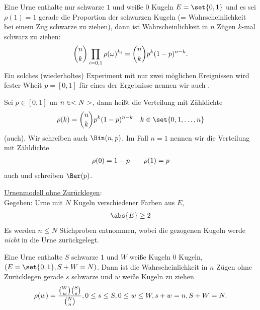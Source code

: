 \begin{example}
	Eine Urne enthalte nur schwarze $1$ und weiße $0$ Kugeln $E=\set{0,1}$ und es sei $\rho(1) = 1$ gerade die Proportion der schwarzen Kugeln (= Wahrscheinlichkeit bei einem Zug schwarze zu ziehen), dann ist Wahrscheinlichkeit in $n$ Zügen $k$-mal schwarz zu ziehen:
	\begin{align}
		\binom{n}{k}\prod_{i=0,1} \rho(\omega)^{k_i} = \binom{n}{k}p^k(1-p)^{n-k}.\notag
	\end{align}
	Ein solches (wiederholtes) Experiment mit nur zwei möglichen Ereignissen wird fester Wheit $p = [0,1]$ für eines der Ergebnisse nennen wir auch .
\end{example}

\begin{definition}
	Sei $p \in [0,1]$ un $n \in <N>$, dann heißt die Verteilung mit Zähldichte
	\begin{align}
		\rho(k) = \binom{n}{k}p^k (1-p)^{n-k}\quad k \in \set{0,1,\dots,n}\notag
	\end{align}
	 (auch). Wir schreiben auch $\Bin(n,p)$. Im Fall $n = 1$ nennen wir die Verteilung mit Zähldichte
	\begin{align}
		\rho(0) = 1-p \qquad \rho(1) = p\notag
	\end{align}
	auch  und schreiben $\Ber(p)$.
\end{definition}
\underline{Urnenmodell ohne Zurücklegen}: \\
Gegeben: Urne mit $N$ Kugeln verschiedener Farben aus $E$,
\begin{align}
	\abs{E} \ge 2
\end{align}
Es werden $n \le N$ Stichproben entnommen, wobei die gezogenen Kugeln werde \emph{nicht} in die Urne zurückgelegt.
\begin{example}
	Eine Urne enthalte $S$ schwarze $1$ und $W$ weiße Kugeln $0$ Kugeln, $(E = \set{0,1}, S + W =N)$. Dann ist die Wahrscheinlichkeit in $n$ Zügen ohne Zurücklegen gerade $s$ schwarze und $w$ weiße Kugeln zu ziehen
	\begin{align}
		\rho(w) = \frac{\binom{W}{w}\binom{S}{s}}{\binom{N}{n}}, 0 \le s \le S, 0 \le w \le W, s+w = n, S+W = N.\notag
	\end{align}
\end{example}

